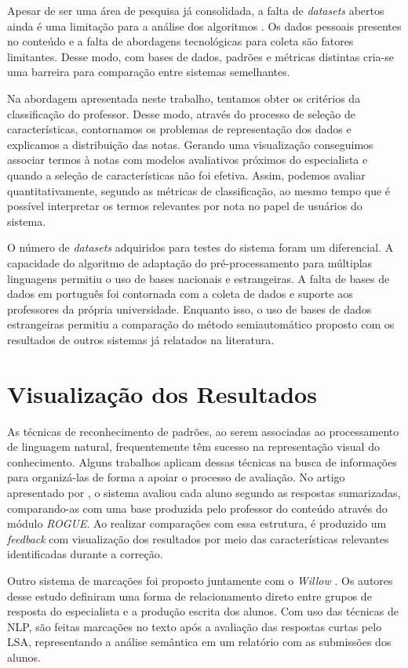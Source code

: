 Apesar de ser uma área de pesquisa já consolidada, a falta de \textit{datasets} abertos ainda é uma limitação para a análise dos algoritmos \cite{burrows2015}. Os dados pessoais presentes no conteúdo e a falta de abordagens tecnológicas para coleta são fatores limitantes. Desse modo, com bases de dados, padrões e métricas distintas cria-se uma barreira para comparação entre sistemas semelhantes.

Na abordagem apresentada neste trabalho, tentamos obter os critérios da classificação do professor. Desse modo, através do processo de seleção de características, contornamos os problemas de representação dos dados e explicamos a distribuição das notas. Gerando uma visualização conseguimos associar termos à notas com modelos avaliativos próximos do especialista e quando a seleção de características não foi efetiva. Assim, podemos avaliar quantitativamente, segundo as métricas de classificação, ao mesmo tempo que é possível interpretar os termos relevantes por nota no papel de usuários do sistema.

O número de \textit{datasets} adquiridos para testes do sistema foram um diferencial. A capacidade do algoritmo de adaptação do pré-processamento para múltiplas linguagens permitiu o uso de bases nacionais e estrangeiras. A falta de bases de dados em português foi contornada com a coleta de dados e suporte aos professores da própria universidade. Enquanto isso, o uso de bases de dados estrangeiras permitiu a comparação do método semiautomático proposto com os resultados de outros sistemas já relatados na literatura.

\section{Visualização dos Resultados}
As técnicas de reconhecimento de padrões, ao serem associadas ao processamento de linguagem natural, frequentemente têm sucesso na representação visual do conhecimento. Alguns trabalhos aplicam dessas técnicas na busca de informações para organizá-las de forma a apoiar o processo de avaliação. No artigo apresentado por , o sistema avaliou cada aluno segundo as respostas sumarizadas, comparando-as com uma base produzida pelo professor do conteúdo através do módulo \textit{ROGUE}. Ao realizar comparações com essa estrutura, é produzido um \textit{feedback} com visualização dos resultados por meio das características relevantes identificadas durante a correção.

Outro sistema de marcações foi proposto juntamente com o \textit{Willow} \cite{perez2006}. Os autores desse estudo definiram uma forma de relacionamento direto entre grupos de resposta do especialista e a produção escrita dos alunos. Com uso das técnicas de NLP, são feitas marcações no texto após a avaliação das respostas curtas pelo LSA, representando a análise semântica em um relatório com as submissões dos alunos.

